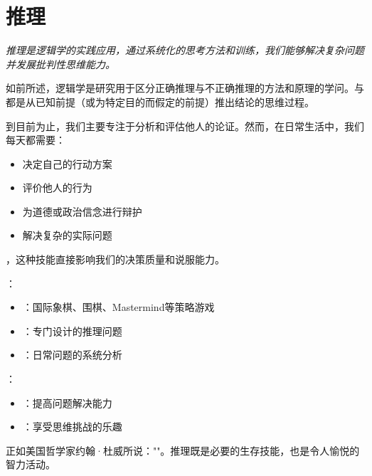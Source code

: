 \section{推理}

\begin{logicbox}[title=引言]
\textit{推理是逻辑学的实践应用，通过系统化的思考方法和训练，我们能够解决复杂问题并发展批判性思维能力。}
\end{logicbox}

如前所述，逻辑学是研究用于区分正确推理与不正确推理的方法和原理的学问。与都是从已知前提（或为特定目的而假定的前提）推出结论的思维过程。

到目前为止，我们主要专注于分析和评估他人的论证。然而，在日常生活中，我们每天都需要：
\begin{itemize}
  \item 决定自己的行动方案
  \item 评价他人的行为
  \item 为道德或政治信念进行辩护
  \item 解决复杂的实际问题
\end{itemize}

，这种技能直接影响我们的决策质量和说服能力。

\begin{theorembox}[title=推理技能的培养]
：
\begin{itemize}
  \item {}：国际象棋、围棋、Mastermind等策略游戏
  \item {}：专门设计的推理问题
  \item {}：日常问题的系统分析
\end{itemize}

：
\begin{itemize}
  \item {}：提高问题解决能力
  \item {}：享受思维挑战的乐趣
\end{itemize}
\end{theorembox}

正如美国哲学家约翰·杜威所说：""。推理既是必要的生存技能，也是令人愉悦的智力活动。

